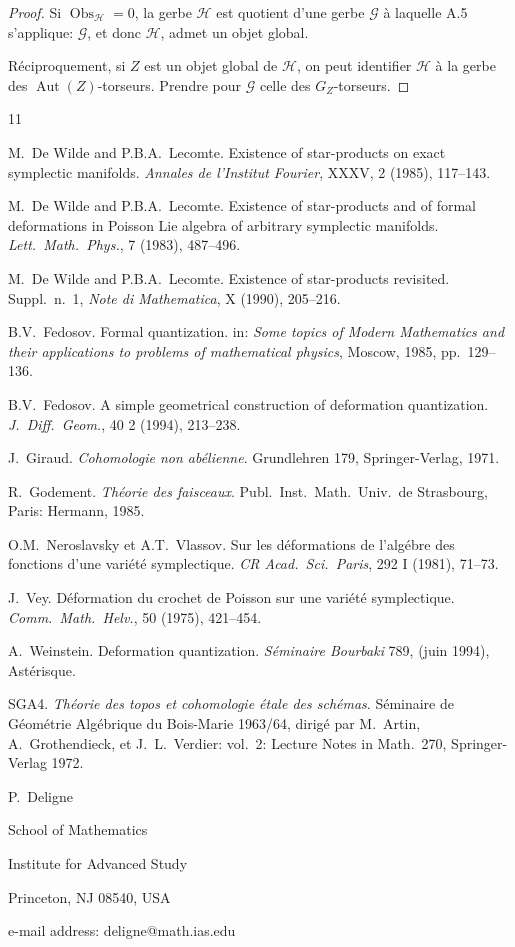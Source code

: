 \documentclass[11pt,a4paper]{article}
\theoremstyle{plain}
\theoremstyle{definition}
\DeclareMathOperator{\Aut}{Aut}
\DeclareMathOperator{\Obs}{Obs}
\begin{document}
\begin{proof}
Si $\Obs_{\mathcal{H}} = 0$, la gerbe $\mathcal{H}$ est quotient d'une gerbe $\mathcal{G}$ \`a laquelle A.5 s'applique:
$\mathcal{G}$, et donc $\mathcal{H}$, admet un objet global.

R\'eciproquement, si $Z$ est un objet global de $\mathcal{H}$, on peut identifier $\mathcal{H}$ \`a la gerbe
des $\Aut(Z)$-torseurs. Prendre pour $\mathcal{G}$ celle des $G_{Z}$-torseurs.
\end{proof}

\begin{thebibliography}{11}

M.~De Wilde and P.B.A.~Lecomte. Existence of star-products on exact symplectic manifolds. \textit{Annales de l'Institut Fourier}, XXXV, 2 (1985), 117--143.

M.~De Wilde and P.B.A.~Lecomte. Existence of star-products and of formal deformations in Poisson Lie algebra of arbitrary symplectic manifolds. \textit{Lett.\ Math.\ Phys.}, 7 (1983), 487--496.

M.~De Wilde and P.B.A.~Lecomte. Existence of star-products revisited. Suppl.\ n.~1, \textit{Note di Mathematica}, X (1990), 205--216.

B.V.~Fedosov. Formal quantization. in: \textit{Some topics of Modern Mathematics and their applications to problems of mathematical physics}, Moscow, 1985, pp.\ 129--136.

B.V.~Fedosov. A simple geometrical construction of deformation quantization. \textit{J.\ Diff.\ Geom.}, 40 2 (1994), 213--238.

J.~Giraud. \textit{Cohomologie non ab\'elienne}. Grundlehren 179, Springer-Verlag, 1971.

R.~Godement. \textit{Th\'eorie des faisceaux}. Publ.\ Inst.\ Math.\ Univ.\ de Strasbourg, Paris: Hermann, 1985.

O.M.~Neroslavsky et A.T.~Vlassov. Sur les d\'eformations de l'alg\'ebre des fonctions d'une vari\'et\'e symplectique. \textit{CR Acad.\ Sci.\ Paris}, 292 I (1981), 71--73.

J.~Vey. D\'eformation du crochet de Poisson sur une vari\'et\'e symplectique. \textit{Comm.\ Math.\ Helv.}, 50 (1975), 421--454.

A.~Weinstein. Deformation quantization. \textit{S\'eminaire Bourbaki} 789, (juin 1994), Ast\'erisque.

SGA4. \textit{Th\'eorie des topos et cohomologie \'etale des sch\'emas}. S\'eminaire de G\'eom\'etrie Alg\'ebrique du Bois-Marie 1963/64, dirig\'e par M.~Artin, A.~Grothendieck, et J.~L.~Verdier: vol.~2: Lecture Notes in Math.\ 270, Springer-Verlag 1972.

\end{thebibliography}

\vspace{1cm}
\noindent P.~Deligne

\noindent School of Mathematics

\noindent Institute for Advanced Study

\noindent Princeton, NJ 08540, USA

\noindent e-mail address: deligne@math.ias.edu
\end{document}

